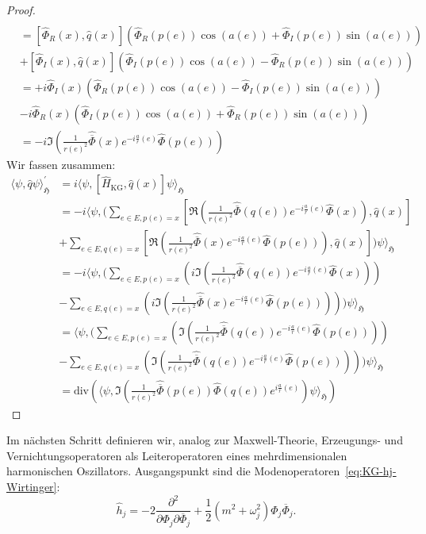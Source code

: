 \documentclass[11pt,a4paper,leqno]{report}
\numberwithin{equation}{chapter}
\begin{document}
\begin{proof}
		\begin{align*}
		[\Re(\frac{1}{r(e)^2}&\hat{\overline{\Phi}}(x)e^{-i\frac{a}{r}(e)}\hat{\Phi}(p(e))), \hat{q}(x)]\\
		&=[\hat{\Phi}_R(x), \hat{q}(x)](\hat{\Phi}_R(p(e))\cos(a(e)) + \hat{\Phi}_I(p(e))\sin(a(e)))\\
		&+[\hat{\Phi}_I(x), \hat{q}(x)](\hat{\Phi}_I(p(e))\cos(a(e)) - \hat{\Phi}_R(p(e))\sin(a(e)))\\
		&=+i\hat{\Phi}_I(x)(\hat{\Phi}_R(p(e))\cos(a(e)) - \hat{\Phi}_I(p(e))\sin(a(e)))\\
		&-i\hat{\Phi}_R(x)(\hat{\Phi}_I(p(e))\cos(a(e)) + \hat{\Phi}_R(p(e))\sin(a(e)))\\
		&=-i \Im(\frac{1}{r(e)^2}\hat{\overline{\Phi}}(x)e^{-i\frac{a}{r}(e)}\hat{\Phi}(p(e)))
	\end{align*}
	Wir fassen zusammen:
	\begin{align*}
		\langle \psi, \hat{q}\psi\rangle_\mathfrak{H}^\prime &=i\langle \psi, [\hat{H}_{\mathrm{KG}},\hat{q}(x)]\psi\rangle_\mathfrak{H} \\&=-i\langle \psi, (\sum_{e\in E, p(e)=x}[\Re(\frac{1}{r(e)^2}\hat{\overline{\Phi}}(q(e))e^{-i\frac{a}{r}(e)}\hat{\Phi}(x)) ,\hat{q}(x)]\\&+
		\sum_{e\in E, q(e)=x}[\Re(\frac{1}{r(e)^2}\hat{\overline{\Phi}}(x)e^{-i\frac{a}{r}(e)}\hat{\Phi}(p(e))) ,\hat{q}(x)])\psi\rangle_\mathfrak{H} \\&
		=-i\langle \psi, (\sum_{e\in E, p(e)=x}(i \Im(\frac{1}{r(e)^2}\hat{\overline{\Phi}}(q(e))e^{-i\frac{a}{r}(e)}\hat{\Phi}(x)))\\&-
		\sum_{e\in E, q(e)=x}(i \Im(\frac{1}{r(e)^2}\hat{\overline{\Phi}}(x)e^{-i\frac{a}{r}(e)}\hat{\Phi}(p(e)))))\psi\rangle_\mathfrak{H} \\&
		=\langle \psi, (\sum_{e\in E, p(e)=x}(\Im(\frac{1}{r(e)^2}\hat{\overline{\Phi}}(q(e))e^{-i\frac{a}{r}(e)}\hat{\Phi}(p(e))))\\&-
		\sum_{e\in E, q(e)=x}(\Im(\frac{1}{r(e)^2}\hat{\overline{\Phi}}(q(e))e^{-i\frac{a}{r}(e)}\hat{\Phi}(p(e)))))\psi\rangle_\mathfrak{H} \\
		&=\text{div}(\langle \psi, \Im(\frac{1}{r(e)^2} \hat{\overline{\Phi}}(p(e))\hat{\Phi}(q(e))e^{i\frac{a}{r}(e)}) \psi\rangle_\mathfrak{H}) 
	\end{align*}
\end{proof}
\noindent
\noindent
Im nächsten Schritt definieren wir, analog zur Maxwell-Theorie, Erzeugungs- und Vernichtungsoperatoren als Leiteroperatoren eines mehrdimensionalen harmonischen Oszillators. Ausgangspunkt sind die Modenoperatoren~\eqref{eq:KG-hj-Wirtinger}:
\begin{equation}\label{eq:KG-hj-wirtinger}
	\hat{h}_j = -2\frac{\partial^2}{\partial\Phi_j\partial\overline{\Phi}_j} + \frac{1}{2}(m^2 + \omega_j^2)\Phi_j\overline{\Phi}_j.
\end{equation}
\end{document}
